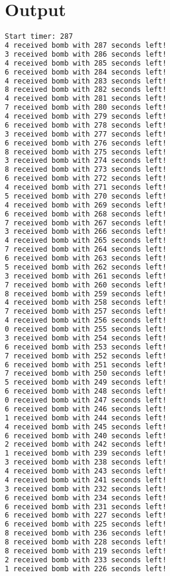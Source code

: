 \documentclass{article}
\begin{document}
\section{Output}
\begin{lstlisting}[language=bash]
Start timer: 287
4 received bomb with 287 seconds left!
3 received bomb with 286 seconds left!
4 received bomb with 285 seconds left!
6 received bomb with 284 seconds left!
4 received bomb with 283 seconds left!
8 received bomb with 282 seconds left!
4 received bomb with 281 seconds left!
7 received bomb with 280 seconds left!
4 received bomb with 279 seconds left!
6 received bomb with 278 seconds left!
3 received bomb with 277 seconds left!
6 received bomb with 276 seconds left!
8 received bomb with 275 seconds left!
3 received bomb with 274 seconds left!
8 received bomb with 273 seconds left!
6 received bomb with 272 seconds left!
4 received bomb with 271 seconds left!
5 received bomb with 270 seconds left!
4 received bomb with 269 seconds left!
6 received bomb with 268 seconds left!
7 received bomb with 267 seconds left!
3 received bomb with 266 seconds left!
4 received bomb with 265 seconds left!
7 received bomb with 264 seconds left!
6 received bomb with 263 seconds left!
5 received bomb with 262 seconds left!
3 received bomb with 261 seconds left!
7 received bomb with 260 seconds left!
8 received bomb with 259 seconds left!
4 received bomb with 258 seconds left!
7 received bomb with 257 seconds left!
4 received bomb with 256 seconds left!
0 received bomb with 255 seconds left!
3 received bomb with 254 seconds left!
6 received bomb with 253 seconds left!
7 received bomb with 252 seconds left!
6 received bomb with 251 seconds left!
7 received bomb with 250 seconds left!
5 received bomb with 249 seconds left!
6 received bomb with 248 seconds left!
0 received bomb with 247 seconds left!
6 received bomb with 246 seconds left!
1 received bomb with 244 seconds left!
4 received bomb with 245 seconds left!
6 received bomb with 240 seconds left!
2 received bomb with 242 seconds left!
1 received bomb with 239 seconds left!
3 received bomb with 238 seconds left!
4 received bomb with 243 seconds left!
4 received bomb with 241 seconds left!
3 received bomb with 232 seconds left!
6 received bomb with 234 seconds left!
6 received bomb with 231 seconds left!
6 received bomb with 227 seconds left!
6 received bomb with 225 seconds left!
8 received bomb with 236 seconds left!
8 received bomb with 228 seconds left!
8 received bomb with 219 seconds left!
2 received bomb with 233 seconds left!
1 received bomb with 226 seconds left!

\end{lstlisting}
\end{document}
